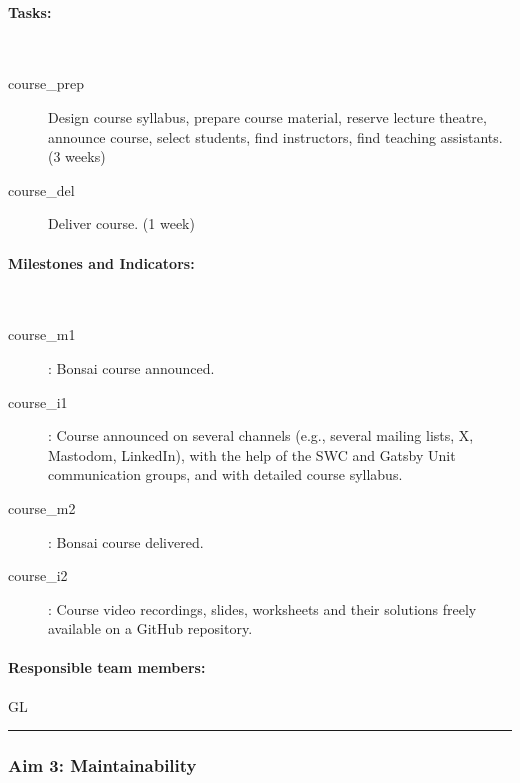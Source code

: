 \paragraph{Tasks:}\mbox{}\\

\begin{description}

    \item[course\_prep] Design course syllabus, prepare course material,
    reserve lecture theatre, announce course, select students, find instructors, find teaching
    assistants. (3 weeks)

    \item[course\_del] Deliver course. (1 week)

\end{description}

\paragraph{Milestones and Indicators:}\mbox{}\\

\begin{description}

    \item[course\_m1]: Bonsai course announced.

    \item[course\_i1]: Course announced on several channels (e.g., several
    mailing lists, X, Mastodom, LinkedIn), with the help of the SWC and Gatsby
    Unit communication groups, and with detailed course syllabus.

    \item[course\_m2]: Bonsai course delivered.

    \item[course\_i2]: Course video recordings, slides, worksheets and their
        solutions freely available on a GitHub repository.

\end{description}

\paragraph{Responsible team members:} GL

\noindent\rule{\textwidth}{1pt}
\subsubsection{Aim 3: Maintainability}

